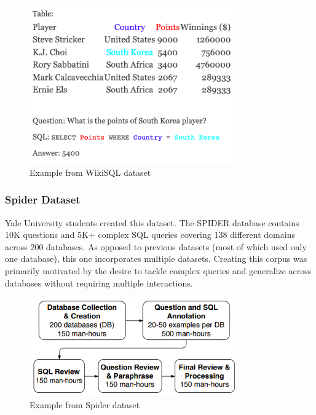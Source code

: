 \begin{figure}[htb]
    \centering
    \includegraphics[width=0.8\textwidth]{pics/db/WikiSQL.png}
    \caption{Example from WikiSQL dataset}
    \label{fig:WikiSQL}
\end{figure}

\subsubsection*{Spider Dataset}

Yale University students created this dataset.
The SPIDER database contains 10K questions and 5K+ complex SQL queries covering 138 different domains across 200 databases. As opposed to previous datasets (most of which used only one database), this one incorporates multiple datasets. Creating this corpus was primarily motivated by the desire to tackle complex queries and generalize across databases without requiring multiple interactions.


\begin{figure}[htb]
    \centering
    \includegraphics[width=0.8\textwidth]{pics/db/Spider.png}
    \caption{Example from Spider dataset}
    \label{fig:Spider}
\end{figure}

